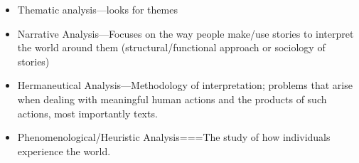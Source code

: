 \documentclass{TC}
\begin{document}
\begin{itemize}
\begin{itemize}
	\item Thematic analysis---looks for themes
	\item Narrative Analysis---Focuses on the way people make/use stories to interpret the world around them (structural/functional approach or sociology of stories)
	\item Hermaneutical Analysis---Methodology of interpretation; problems that arise when dealing with meaningful human actions and the products of such actions, most importantly texts.
	\item Phenomenological/Heuristic Analysis===The study of how individuals experience the world. 
	\end{itemize}
\end{itemize}
\end{document}
